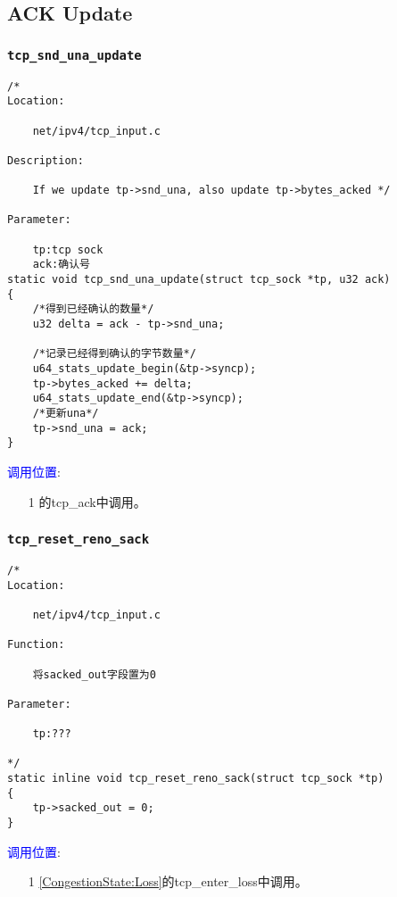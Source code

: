     \subsection{ACK Update}
        \subsubsection{\texttt{tcp_snd_una_update}}
            \label{ACKUpdate:tcp_snd_una_update}
\begin{verbatim}
/* 
Location:

    net/ipv4/tcp_input.c

Description:

    If we update tp->snd_una, also update tp->bytes_acked */

Parameter:
    
    tp:tcp sock
    ack:确认号
static void tcp_snd_una_update(struct tcp_sock *tp, u32 ack)
{
    /*得到已经确认的数量*/
    u32 delta = ack - tp->snd_una;

    /*记录已经得到确认的字节数量*/
    u64_stats_update_begin(&tp->syncp);
    tp->bytes_acked += delta;
    u64_stats_update_end(&tp->syncp);
    /*更新una*/
    tp->snd_una = ack;
}
\end{verbatim}

        \textcolor{blue}{调用位置}:
            \begin{enumerate}
                \item[1]        \label{ClientReceiveSYN+ACK:tcp_ack}的tcp\_ack中调用。
            \end{enumerate}

        \subsubsection{\texttt{tcp_reset_reno_sack}}
            \label{ACKUpdate:tcp_reset_reno_sack}
\begin{verbatim}
/*
Location:

    net/ipv4/tcp_input.c

Function:

    将sacked_out字段置为0

Parameter:

    tp:???

*/
static inline void tcp_reset_reno_sack(struct tcp_sock *tp)
{
    tp->sacked_out = 0;
}
\end{verbatim}    

		\textcolor{blue}{调用位置}:
            \begin{enumerate}
                \item[1]        \ref{CongestionState:Loss}的tcp\_enter\_loss中调用。
            \end{enumerate}

